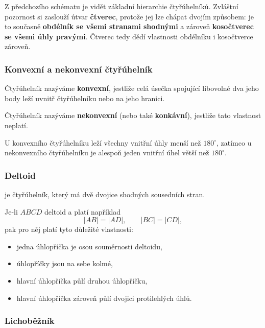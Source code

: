 \documentclass[12pt,a4paper]{article}
\begin{document}
Z předchozího schématu je vidět základní hierarchie čtyřúhelníků. Zvláštní pozornost si
zaslouží útvar \textbf{čtverec}, protože jej lze chápat dvojím způsobem: je to současně
\textbf{obdélník se všemi stranami shodnými} a zároveň \textbf{kosočtverec se všemi úhly pravými}.
Čtverec tedy dědí vlastnosti obdélníku i kosočtverce zároveň.

\subsubsection{Konvexní a nekonvexní čtyřúhelník}

\begin{definitionbox}
Čtyřúhelník nazýváme \textbf{konvexní}, jestliže celá úsečka spojující libovolné dva jeho body
leží uvnitř čtyřúhelníku nebo na jeho hranici.

Čtyřúhelník nazýváme \textbf{nekonvexní} (nebo také \textbf{konkávní}), jestliže tato vlastnost
neplatí.
\end{definitionbox}

U konvexního čtyřúhelníku leží všechny vnitřní úhly menší než $180^\circ$, zatímco
u nekonvexního čtyřúhelníku je alespoň jeden vnitřní úhel větší než $180^\circ$.

\subsubsection{Deltoid}

\begin{definitionbox}
 je čtyřúhelník, který má dvě dvojice shodných sousedních stran.
\end{definitionbox}

Je-li $ABCD$ deltoid a platí například
\[
    |AB|=|AD|,
    \qquad
    |BC|=|CD|,
\]
pak pro něj platí tyto důležité vlastnosti:

\begin{itemize}
    \item jedna úhlopříčka je osou souměrnosti deltoidu,
    \item úhlopříčky jsou na sebe kolmé,
    \item hlavní úhlopříčka půlí druhou úhlopříčku,
    \item hlavní úhlopříčka zároveň půlí dvojici protilehlých úhlů.
\end{itemize}

\subsubsection{Lichoběžník}
\end{document}
